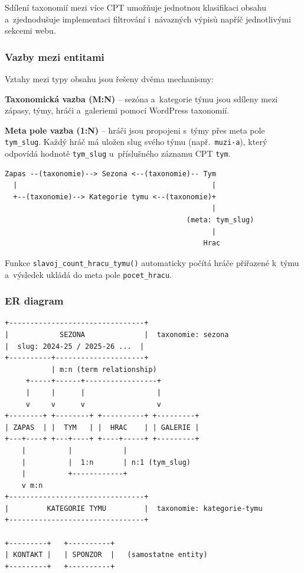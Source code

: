\documentclass[12pt,a4paper]{article}
\begin{document}
Sdílení taxonomií mezi více CPT umožňuje jednotnou klasifikaci obsahu a~zjednodušuje implementaci filtrování i~návazných výpisů napříč jednotlivými sekcemi webu.

\subsubsection{Vazby mezi entitami}

Vztahy mezi typy obsahu jsou řešeny dvěma mechanismy:

\textbf{Taxonomická vazba (M:N)} -- sezóna a~kategorie týmu jsou sdíleny mezi zápasy, týmy, hráči a~galeriemi pomocí WordPress taxonomií.

\textbf{Meta pole vazba (1:N)} -- hráči jsou propojeni s~týmy přes meta pole \texttt{tym\_slug}. Každý hráč má uložen slug svého týmu (např.\ \texttt{muzi-a}), který odpovídá hodnotě \texttt{tym\_slug} u~příslušného záznamu CPT \texttt{tym}.

\begin{lstlisting}
Zapas --(taxonomie)--> Sezona <--(taxonomie)-- Tym
  |                                              |
  +--(taxonomie)--> Kategorie tymu <--(taxonomie)+
                                                 |
                                           (meta: tym_slug)
                                                 |
                                               Hrac
\end{lstlisting}

Funkce \texttt{slavoj\_count\_hracu\_tymu()} automaticky počítá hráče přiřazené k~týmu a~výsledek ukládá do meta pole \texttt{pocet\_hracu}.

\subsubsection{ER diagram}

\begin{lstlisting}
+--------------------------------+
|            SEZONA              |  taxonomie: sezona
|  slug: 2024-25 / 2025-26 ...  |
+----------+---------------------+
           | m:n (term relationship)
     +-----+------+-----------------+
     |     |      |                 |
     v     v      v                 v
+--------+ +--------+ +----------+ +---------+
| ZAPAS  | |  TYM   | |  HRAC    | | GALERIE |
+---+----+ +---+----+ +----+-----+ +---------+
    |          |            |
    |          |  1:n       | n:1 (tym_slug)
    |          +------------+
    v m:n
+--------------------------------+
|         KATEGORIE TYMU         |  taxonomie: kategorie-tymu
+--------------------------------+

+---------+   +----------+
| KONTAKT |   | SPONZOR  |   (samostatne entity)
+---------+   +----------+
\end{lstlisting}
\end{document}
